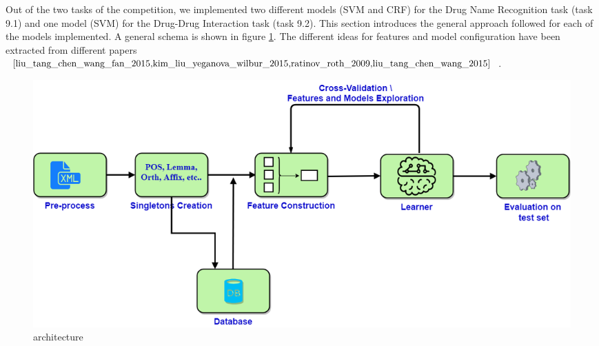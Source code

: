 
    
   Out of the two tasks of the competition, we implemented two different models (SVM and CRF) for the Drug Name Recognition task (task 9.1) and one model (SVM) for the Drug-Drug Interaction task (task 9.2). This section introduces the general approach followed for each of the models implemented. A general schema is shown in figure \ref{architecture}. The different ideas for features and model configuration have been extracted from different papers $\cite{liu_tang_chen_wang_fan_2015,kim_liu_yeganova_wilbur_2015,ratinov_roth_2009,liu_tang_chen_wang_2015}$.\\
   
\begin{figure}[H]
\centering
\includegraphics[scale=0.3]{ProcessCV.png}\caption{architecture}\label{architecture}
\end{figure}

